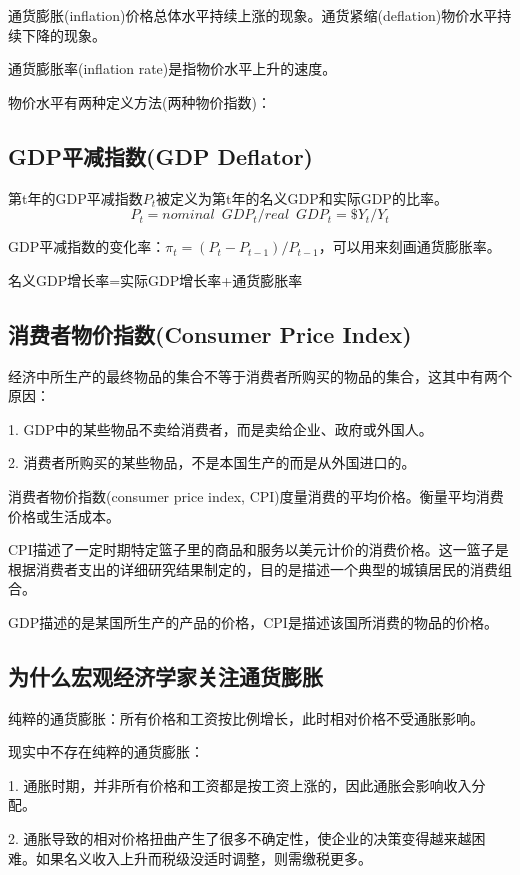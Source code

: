 \documentclass{article}
\begin{document}
通货膨胀(inflation)价格总体水平持续上涨的现象。通货紧缩(deflation)物价水平持续下降的现象。

通货膨胀率(inflation rate)是指物价水平上升的速度。

物价水平有两种定义方法(两种物价指数)：
\subsection{GDP平减指数(GDP Deflator)}
第t年的GDP平减指数$ P_t $被定义为第t年的名义GDP和实际GDP的比率。
\[
P_t=nominal\enspace GDP_t/real\enspace GDP_t=\$Y_t/Y_t
\]

GDP平减指数的变化率：$ \pi_t=(P_t-P_{t-1})/P_{t-1} $，可以用来刻画通货膨胀率。

名义GDP增长率=实际GDP增长率+通货膨胀率

\subsection{消费者物价指数(Consumer Price Index)}
经济中所生产的最终物品的集合不等于消费者所购买的物品的集合，这其中有两个原因：

1. GDP中的某些物品不卖给消费者，而是卖给企业、政府或外国人。

2. 消费者所购买的某些物品，不是本国生产的而是从外国进口的。

\hspace*{\fill}

消费者物价指数(consumer price index, CPI)度量消费的平均价格。衡量平均消费价格或生活成本。

CPI描述了一定时期特定篮子里的商品和服务以美元计价的消费价格。这一篮子是根据消费者支出的详细研究结果制定的，目的是描述一个典型的城镇居民的消费组合。

\hspace*{\fill}

GDP描述的是某国所生产的产品的价格，CPI是描述该国所消费的物品的价格。

\subsection{为什么宏观经济学家关注通货膨胀}
纯粹的通货膨胀：所有价格和工资按比例增长，此时相对价格不受通胀影响。

现实中不存在纯粹的通货膨胀：

1. 通胀时期，并非所有价格和工资都是按工资上涨的，因此通胀会影响收入分配。

2. 通胀导致的相对价格扭曲产生了很多不确定性，使企业的决策变得越来越困难。如果名义收入上升而税级没适时调整，则需缴税更多。
\end{document}
